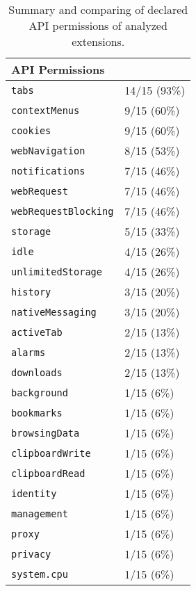	\begin{table}[h]
		\centering
		\begin{tabular}{|l|l|} \hline
			\textbf{API Permissions} &  \\ \hline
			\texttt{tabs} & 14/15 (93\%) \\
			\texttt{contextMenus} & 9/15 (60\%) \\
			\texttt{cookies} & 9/15 (60\%) \\
			\texttt{webNavigation} & 8/15 (53\%) \\
			\texttt{notifications} & 7/15 (46\%) \\
			\texttt{webRequest} & 7/15 (46\%) \\
			\texttt{webRequestBlocking} & 7/15 (46\%) \\
			\texttt{storage} & 5/15 (33\%) \\
			\texttt{idle} & 4/15 (26\%) \\
			\texttt{unlimitedStorage} & 4/15 (26\%) \\
			\texttt{history} & 3/15 (20\%) \\
			\texttt{nativeMessaging} & 3/15 (20\%) \\
			\texttt{activeTab} & 2/15 (13\%) \\
			\texttt{alarms} & 2/15 (13\%) \\
			\texttt{downloads} & 2/15 (13\%) \\
			\texttt{background} & 1/15 (6\%) \\
			\texttt{bookmarks} & 1/15 (6\%) \\
			\texttt{browsingData} & 1/15 (6\%) \\
			\texttt{clipboardWrite} & 1/15 (6\%) \\
			\texttt{clipboardRead} & 1/15 (6\%) \\
			\texttt{identity} & 1/15 (6\%) \\
			\texttt{management} & 1/15 (6\%) \\
			\texttt{proxy} & 1/15 (6\%) \\
			\texttt{privacy} & 1/15 (6\%) \\
			\texttt{system.cpu} & 1/15 (6\%) \\
			\hline
		\end{tabular}
		\caption{Summary and comparing of declared API permissions of analyzed extensions.}
		\label{tab:analysisSummaryPermissions}
	\end{table}
	

	
